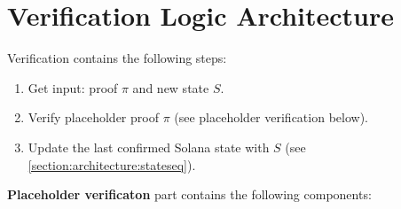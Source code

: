 \section{Verification Logic Architecture}

Verification contains the following steps:
\begin{enumerate}
    \item Get input: proof $\pi$ and new state $S$.
    \item Verify placeholder proof $\pi$ (see placeholder verification below).
    \item Update the last confirmed Solana state with $S$
        (see \ref{section:architecture:stateseq}).
\end{enumerate}


\textbf{Placeholder verificaton} part contains the following components:

